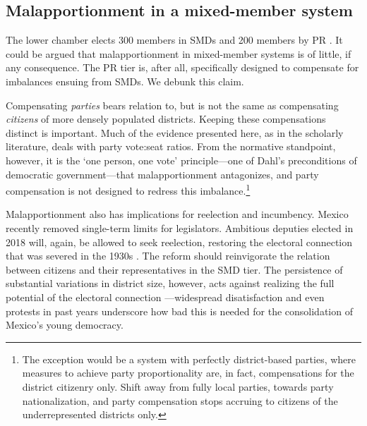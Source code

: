 \documentclass[letter,12pt]{article}
\begin{document}

\subsection{Malapportionment in a mixed-member system}

\noindent The lower chamber elects 300 members in SMDs and 200 members by PR \citep{weldonMixedMemberSys2001}. It could be argued that malapportionment in mixed-member systems is of little, if any consequence. The PR tier is, after all, specifically designed to compensate for imbalances ensuing from SMDs. We debunk this claim. 


Compensating \emph{parties} bears relation to, but is not the same as compensating \emph{citizens} of more densely populated districts. Keeping these compensations distinct is important. Much of the evidence presented here, as in the scholarly literature, deals with party vote:seat ratios. From the normative standpoint, however, it is the `one person, one vote' principle---one of Dahl's \citeyearpar{dahl.1972} preconditions of democratic government---that malapportionment antagonizes, and party compensation is not designed to redress this imbalance.\footnote{The exception would be a system with perfectly district-based parties, where measures to achieve party proportionality are, in fact, compensations for the district citizenry only. Shift away from fully local parties, towards party nationalization, and party compensation stops accruing to citizens of the underrepresented districts only.}

Malapportionment also has implications for reelection and incumbency. Mexico recently removed single-term limits for legislators. Ambitious deputies elected in 2018 will, again, be allowed to seek reelection, restoring the electoral connection that was severed in the 1930s \citep{dworak.legisladorAexamen.2003}. The reform should reinvigorate the relation between citizens and their representatives in the SMD tier. The persistence of substantial variations in district size, however, acts against realizing the full potential of the electoral connection \citep{mayhew.1974}---widespread disatisfaction and even protests in past years underscore how bad this is needed for the consolidation of Mexico's young democracy. 
\end{document}

